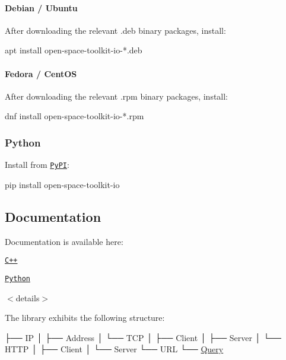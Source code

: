 \paragraph*{Debian / Ubuntu}

After downloading the relevant {\ttfamily .deb} binary packages, install\+:


\begin{DoxyCode}
apt install open-space-toolkit-io-*.deb
\end{DoxyCode}


\paragraph*{Fedora / Cent\+OS}

After downloading the relevant {\ttfamily .rpm} binary packages, install\+:


\begin{DoxyCode}
dnf install open-space-toolkit-io-*.rpm
\end{DoxyCode}


\subsubsection*{Python}

Install from \href{https://pypi.org/project/open-space-toolkit-io/}{\tt Py\+PI}\+:


\begin{DoxyCode}
pip install open-space-toolkit-io
\end{DoxyCode}


\subsection*{Documentation}

Documentation is available here\+:


\begin{DoxyItemize}
\item \href{https://open-space-collective.github.io/open-space-toolkit-io}{\tt C++}
\item \href{./bindings/python/docs}{\tt Python}
\end{DoxyItemize}

$<$details$>$

The library exhibits the following structure\+:


\begin{DoxyCode}
├── IP
│   ├── Address
│   └── TCP
│       ├── Client
│       ├── Server
│       └── HTTP
│           ├── Client
│           └── Server
└── URL
    └── \hyperlink{namespaceostk_1_1io_aeabc644ba5c25896df8014bd0271f970}{Query}
\end{DoxyCode}


